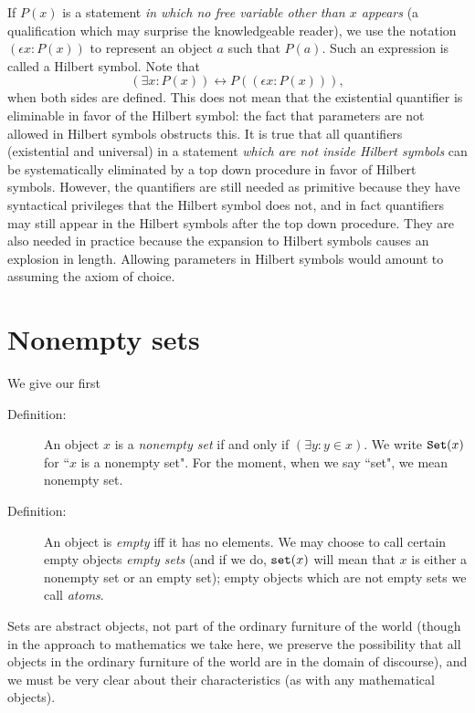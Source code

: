 \documentclass[12pt]{article}
\begin{document}
If $P(x)$ is a statement {\em in which no free variable other than $x$ appears\/} (a qualification which may surprise the knowledgeable reader), we use the notation $(\epsilon x:P(x))$ to represent an object $a$ such that $P(a)$.  Such an expression is called a Hilbert symbol.  Note that $$(\exists x:P(x)) \leftrightarrow P((\epsilon x:P(x))),$$  when both sides are defined.  This does not mean that the existential quantifier is eliminable in favor of the Hilbert symbol:  the fact that parameters are not allowed in Hilbert symbols obstructs this.  It is true that all quantifiers (existential and universal) in a statement {\em which are not inside Hilbert symbols\/} can be systematically eliminated by a top down procedure in favor of Hilbert symbols.  However, the quantifiers are still needed as primitive because they have syntactical privileges that the Hilbert symbol does not, and in fact quantifiers may still appear in the Hilbert symbols after the top down procedure. They are also needed in practice because the expansion to Hilbert symbols causes an explosion in length.  Allowing parameters in Hilbert symbols would amount to assuming the axiom of choice.
\newpage

\section{Nonempty sets}

We give our first

\begin{description}

\item[Definition:]  An object $x$ is a {\em nonempty set\/} if and only if $(\exists y:y \in x)$.  We write ${\tt Set}(x)$ for ``$x$ is a nonempty set".  For the moment, when we say ``set",  we mean nonempty set.

\item[Definition:]  An object is {\em empty\/} iff it has no elements.  We may choose to call certain empty objects {\em empty sets\/} (and if we do, ${\tt set}(x)$ will mean that $x$ is either a nonempty set or an empty set);  empty objects which are not empty sets we call {\em atoms\/}.

\end{description}

Sets are abstract objects, not part of the ordinary furniture of the world (though in the approach to mathematics we take here, we preserve the possibility that all objects in the ordinary furniture of the world are in the domain of discourse), and we must be very clear about their characteristics (as with any mathematical objects).
\end{document}
